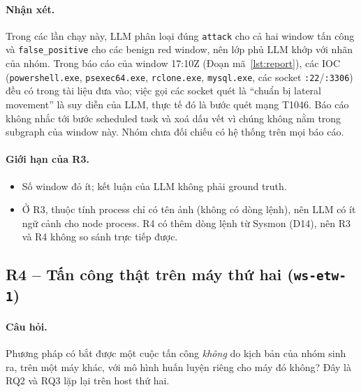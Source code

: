 \paragraph{Nhận xét.}
Trong các lần chạy này, LLM phân loại đúng \texttt{attack} cho cả hai window tấn công và \texttt{false\_positive} cho các benign red window, nên lớp phủ LLM khớp với nhãn của nhóm. Trong báo cáo của window 17:10Z (Đoạn mã~\ref{lst:report}), các IOC (\texttt{powershell.exe}, \texttt{psexec64.exe}, \texttt{rclone.exe}, \texttt{mysql.exe}, các socket \texttt{:22}/\texttt{:3306}) đều có trong tài liệu đưa vào; việc gọi các socket quét là ``chuẩn bị lateral movement'' là suy diễn của LLM, thực tế đó là bước quét mạng T1046. Báo cáo không nhắc tới bước scheduled task và xoá dấu vết vì chúng không nằm trong subgraph của window này. Nhóm chưa đối chiếu có hệ thống trên mọi báo cáo.

\paragraph{Giới hạn của R3.}
\begin{itemize}
    \item Số window đỏ ít; kết luận của LLM không phải ground truth.
    \item Ở R3, thuộc tính process chỉ có tên ảnh (không có dòng lệnh), nên LLM có ít ngữ cảnh cho node process. R4 có thêm dòng lệnh từ Sysmon (D14), nên R3 và R4 không so sánh trực tiếp được.
\end{itemize}

\subsection{R4 -- Tấn công thật trên máy thứ hai (\texttt{ws-etw-1})}
\label{sec:res-ws1}

\paragraph{Câu hỏi.}
Phương pháp có bắt được một cuộc tấn công \emph{không} do kịch bản của nhóm sinh ra, trên một máy khác, với mô hình huấn luyện riêng cho máy đó không? Đây là RQ2 và RQ3 lặp lại trên host thứ hai.

